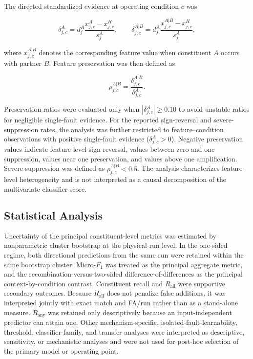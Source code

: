 \documentclass{ieeeaccess}
\begin{document}
The directed standardized evidence at operating condition $c$ was

\begin{equation}
\delta_{j,c}^{A}
=
d_j^{A}
\frac{
x_{j,c}^{A}-x_{j,c}^{H}
}{
s_j^{A}
},
\qquad
\delta_{j,c}^{A|B}
=
d_j^{A}
\frac{
x_{j,c}^{A|B}-x_{j,c}^{H}
}{
s_j^{A}
},
\label{eq:directed_standardized_evidence}
\end{equation}

where $x_{j,c}^{A|B}$ denotes the corresponding feature value when
constituent $A$ occurs with partner $B$. Feature preservation was then
defined as

\begin{equation}
\rho_{j,c}^{A|B}
=
\frac{
\delta_{j,c}^{A|B}
}{
\delta_{j,c}^{A}
}.
\label{eq:preservation_ratio}
\end{equation}

Preservation ratios were evaluated only when
$|\delta_{j,c}^{A}|\geq0.10$ to avoid unstable ratios for negligible
single-fault evidence. For the reported sign-reversal and
severe-suppression rates, the analysis was further restricted to
feature--condition observations with positive single-fault evidence
($\delta_{j,c}^{A}>0$). Negative preservation values indicate feature-level
sign reversal, values between zero and one suppression, values near one
preservation, and values above one amplification. Severe suppression was
defined as $\rho_{j,c}^{A|B}<0.5$. The analysis characterizes feature-level
heterogeneity and is not interpreted as a causal decomposition of the
multivariate classifier score.
\subsection{Statistical Analysis}
\label{subsec:statistical_analysis}

Uncertainty of the principal constituent-level metrics was estimated by
nonparametric cluster bootstrap at the physical-run level. In the one-sided
regime, both directional predictions from the same run were retained within
the same bootstrap cluster. Micro-$F_1$ was treated as the principal aggregate
metric, and the recombination-versus-two-sided difference-of-differences as
the principal context-by-condition contrast. Constituent recall and $R_{\mathrm{all}}$ were supportive secondary outcomes.
Because $R_{\mathrm{all}}$ does not penalize false additions, it was interpreted
jointly with exact match and FA/run rather than as a stand-alone measure.
$R_{\mathrm{any}}$ was retained only descriptively because an input-independent
predictor can attain one. Other mechanism-specific, isolated-fault-learnability, threshold,
classifier-family, and transfer analyses were interpreted as descriptive,
sensitivity, or mechanistic analyses and were not used for post-hoc selection
of the primary model or operating point.
\end{document}
